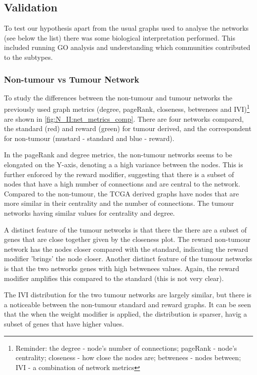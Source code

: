 \subsection{Validation} \label{s:N_II:validation}

To test our hypothesis apart from the usual graphs used to analyse the networks (see below the list) there was some biological interpretation performed. This included running GO analysis and understanding which communities contributed to the subtypes.


\subsubsection{Non-tumour vs Tumour Network} 

To study the differences between the non-tumour and tumour networks the previously used graph metrics (degree, pageRank, closeness, betwenees and IVI)\footnote{Reminder: the degree - node's number of connections; pageRank - node's centrality; closeness - how close the nodes are; betwenees - nodes between; IVI - a combination of network metrics} are shown in \cref{fig:N_II:net_metrics_comp}. There are four networks compared, the standard (red) and reward (green) for tumour derived, and the correspondent for non-tumour (mustard - standard and blue - reward).

In the pageRank and degree metrics, the non-tumour networks seems to be elongated on the Y-axis, denoting a a high variance between the nodes. This is further enforced by the reward modifier, suggesting that there is a subset of nodes that have a high number of connections and are central to the network. Compared to the non-tumour, the TCGA derived graphs have nodes that are more similar in their centrality and the number of connections. The tumour networks having similar values for centrality and degree. 

A distinct feature of the tumour networks is that there the there are a subset of genes that are close together given by the closeness plot. The reward non-tumour network has the nodes closer compared with the standard, indicating the reward modifier 'brings' the node closer. Another distinct feature of the tumour networks is that the two networks genes with high betwenees values. Again, the reward modifier amplifies this compared to the standard (this is not very clear).

The IVI distribution for the two tumour networks are largely similar, but there is a noticeable between the non-tumour standard and reward graphs. It can be seen that the when the weight modifier is applied, the distribution is sparser, havig a subset of genes that have higher values.

